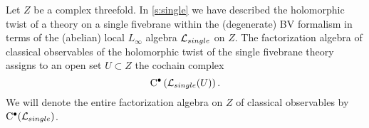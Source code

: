 \documentclass[11pt]{amsart}
\begin{document}
\parsec[s:singleobs]

Let $Z$ be a complex threefold. 
In \ref{s:single} we have described the holomorphic twist of a theory on a single fivebrane within the (degenerate) BV formalism in terms of the (abelian) local $L_\infty$ algebra $\mathcal L_{single}$ on $Z$. 
The factorization algebra of classical observables of the holomorphic twist of the single fivebrane theory assigns to an open set $U \subset Z$
the cochain complex
\[
{\rm C}^\bullet\left(\mathcal L_{single}(U)\right) .
\]
We will denote the entire factorization algebra on $Z$ of classical observables by~${\rm C}^\bullet(\mathcal L_{single})$.
\end{document}
